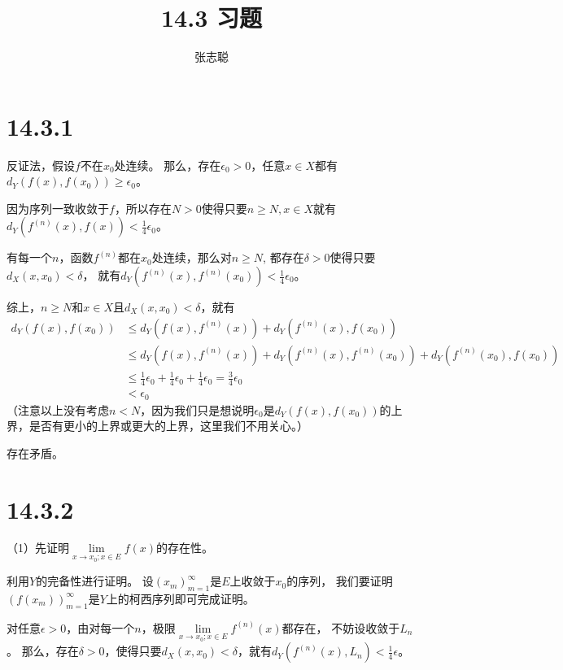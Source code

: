 \documentclass{article}
\begin{document}
\title{14.3 习题}
\author{张志聪}
\maketitle

\section*{14.3.1}

反证法，假设$f$不在$x_0$处连续。
那么，存在$\epsilon_0 > 0$，任意$x \in X$都有$d_Y(f(x), f(x_0)) \geq \epsilon_0$。

因为序列一致收敛于$f$，所以存在$N > 0$使得只要$n \geq N, x \in X$就有$d_Y(f^{(n)}(x), f(x)) < \frac{1}{4} \epsilon_0$。

有每一个$n$，函数$f^{(n)}$都在$x_0$处连续，那么对$n \geq N$, 都存在$\delta > 0$使得只要$d_X(x, x_0) < \delta$，
就有$d_Y(f^{(n)}(x), f^{(n)}(x_0)) < \frac{1}{4} \epsilon_0$。

综上，$n \geq N$和$x \in X$且$d_X(x, x_0) < \delta$，就有
\begin{align*}
  d_Y(f(x), f(x_0)) & \leq d_Y(f(x), f^{(n)}(x)) + d_Y(f^{(n)}(x), f(x_0))                                                   \\
                    & \leq d_Y(f(x), f^{(n)}(x)) + d_Y(f^{(n)}(x), f^{(n)}(x_0)) + d_Y(f^{(n)}(x_0), f(x_0))                 \\
                    & \leq \frac{1}{4} \epsilon_0 + \frac{1}{4} \epsilon_0 + \frac{1}{4} \epsilon_0 = \frac{3}{4} \epsilon_0 \\
                    & < \epsilon_0
\end{align*}
（注意以上没有考虑$n < N$，因为我们只是想说明$\epsilon_0$是$d_Y(f(x), f(x_0))$的上界，是否有更小的上界或更大的上界，这里我们不用关心。）

存在矛盾。

\section*{14.3.2}

（1）先证明$\lim\limits_{x \to x_0; x \in E} f(x)$的存在性。

利用$Y$的完备性进行证明。
设$(x_m)_{m = 1}^\infty$是$E$上收敛于$x_0$的序列，
我们要证明$(f(x_m))_{m = 1}^\infty$是$Y$上的柯西序列即可完成证明。

对任意$\epsilon > 0$，由对每一个$n$，极限$\lim\limits_{x \to x_0; x \in E} f^{(n)}(x)$都存在，
不妨设收敛于$L_n$。
那么，存在$\delta > 0$，使得只要$d_X(x, x_0) < \delta$，就有$d_Y(f^{(n)}(x), L_n) < \frac{1}{4} \epsilon$。
\end{document}

